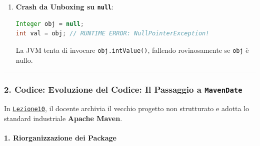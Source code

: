 \documentclass[11pt,a4paper]{article}
\newcommand{\passthrough}[1]{#1}
\begin{document}
\begin{itemize}
\begin{enumerate}
\begin{lstlisting}[language=Java]
Integer a = 100, b = 100;
System.out.println(a == b); // TRUE! (La JVM ricicla lo stesso oggetto cacheato)

Integer c = 200, d = 200;
System.out.println(c == d); // FALSE! (Fuori range [-128, 127], alloca 2 oggetti distinti nello Heap!)
\end{lstlisting}

    Conclusione: \textbf{Mai usare \passthrough{\lstinline!==!} per
    confrontare i wrapper}, usare sempre
    \passthrough{\lstinline!.equals()!}!
  \item
    \textbf{Crash da Unboxing su \passthrough{\lstinline!null!}}:

\begin{lstlisting}[language=Java]
Integer obj = null;
int val = obj; // RUNTIME ERROR: NullPointerException!
\end{lstlisting}

    La JVM tenta di invocare \passthrough{\lstinline!obj.intValue()!},
    fallendo rovinosamente se \passthrough{\lstinline!obj!} è nullo.
  \end{enumerate}
\end{itemize}

\begin{center}\rule{0.5\linewidth}{0.5pt}\end{center}

\subsubsection{\texorpdfstring{2. Codice: Evoluzione del Codice: Il
Passaggio a
\texttt{MavenDate}}{2. Codice: Evoluzione del Codice: Il Passaggio a MavenDate}}\label{codice-evoluzione-del-codice-il-passaggio-a-mavendate}

In
\href{file:///home/wally/Documenti/GitHub/Programmazione-II/25-26/Teoria-e-Esercitazioni/Codice-20260902/Lezione10}{\passthrough{\lstinline!Lezione10!}},
il docente archivia il vecchio progetto non strutturato e adotta lo
standard industriale \textbf{Apache Maven}.

\paragraph{1. Riorganizzazione dei
Package}\label{riorganizzazione-dei-package}
\end{document}

